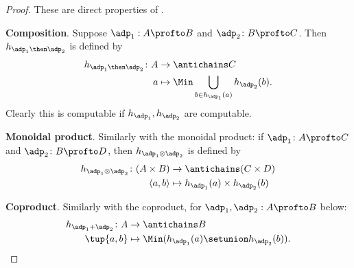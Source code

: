 \begin{proof}
	These are direct properties of \DP.


	\textbf{Composition}.
	Suppose $\adp_1 : A \profto B$ and $\adp_2 \colon B \profto C$.
	Then $h_{\adp_1\then \adp_2} $ is defined by
	\begin{equation}
		\begin{aligned}
			h_{\adp_1 \then \adp_2} \colon A & \to \antichains C                                         \\
			a                                & \mapsto \Min \bigcup_{b \in h_{\adp_1}(a)} h_{\adp_2}(b).
		\end{aligned}
	\end{equation}
	Clearly this is computable if $h_{\adp_1}, h_{\adp_2}$ are computable.


	\textbf{Monoidal product}.
	Similarly with the monoidal product: if $\adp_1 \colon A \profto C$ and $\adp_2 \colon B \profto D$, then $h_{\adp_1 \otimes \adp_2}$ is defined by
	\begin{equation}
		\begin{aligned}
			h_{\adp_1 \otimes \adp_2} \colon (A \times B) & \to \antichains (C \times D)               \\
			\langle a, b \rangle                          & \mapsto h_{\adp_1}(a) \times h_{\adp_2}(b)
		\end{aligned}
	\end{equation}

	\textbf{Coproduct}.
	Similarly with the coproduct, for $\adp_1, \adp_2 : A \profto B$ below:
	\begin{equation}
		\begin{aligned}
			h_{\adp_1 + \adp_2} \colon  A & \to \antichains B                                     \\
			\tup{a,b}                     & \mapsto \Min (h_{\adp_1}(a) \setunion h_{\adp_2}(b)).
		\end{aligned}
	\end{equation}

\end{proof}

